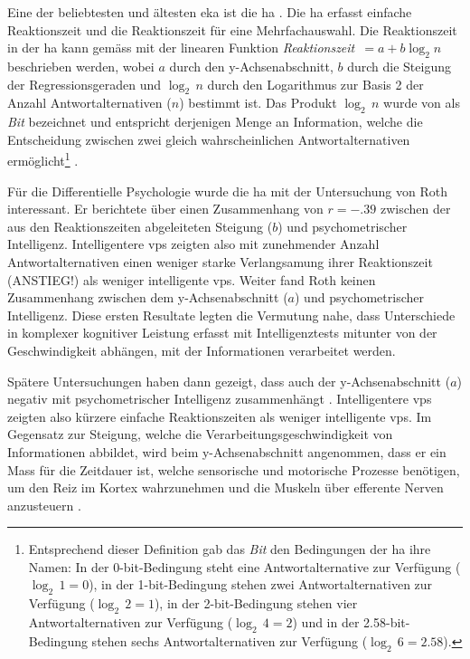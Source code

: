 \documentclass[11pt, twoside, a4paper]{book}		%
\begin{document}
Eine der beliebtesten und ältesten \gls{eka} ist die \gls{ha} \citep{Hick1952}. Die \gls{ha} erfasst einfache Reaktionszeit und die Reaktionszeit für eine Mehrfachauswahl. Die Reaktionszeit in der \gls{ha} kann gemäss \citet[S. 105]{Jensen1987a} mit der linearen Funktion \textit{Reaktionszeit}~$=a+b\log_{2}n$ beschrieben werden, wobei $a$ durch den y-Achsen\-ab\-schnitt, $b$ durch die Steigung der Regres\-sions\-geraden und $\log_{2}\,n$ durch den Logarithmus zur Basis 2 der Anzahl Antwortalternativen ($n$) bestimmt ist. Das Produkt $\log_{2}\,n$ wurde von \citet{Hick1952} als \textit{Bit} bezeichnet und entspricht derjenigen Menge an Information, welche die Entscheidung zwischen zwei gleich wahrscheinlichen Antwortalternativen ermöglicht\footnote{Entsprechend dieser Definition gab das \textit{Bit} den Bedingungen der \gls{ha} ihre Namen: In der 0-bit-Bedingung steht eine Antwortalternative zur Verfügung ($\log_{2}\,1=0$), in der 1-bit-Bedingung stehen zwei Antwortalternativen zur Verfügung ($\log_{2}\,2=1$), in der 2-bit-Bedingung stehen vier Antwortalternativen zur Verfügung ($\log_{2}\,4=2$) und in der 2.58-bit-Bedingung stehen sechs Antwortalternativen zur Verfügung ($\log_{2}\,6=2.58$).} \citep[siehe auch][S. 27]{Jensen2006}.

Für die Differentielle Psychologie wurde die \gls{ha} mit der Untersuchung von Roth \citep[1964; zitiert nach][S. 105]{Jensen1987a} interessant. Er berichtete über einen Zusammenhang von $r=-.39$ zwischen der aus den Reaktionszeiten abgeleiteten Steigung ($b$) und psychometrischer Intelligenz. Intelligentere \glspl{vp} zeigten also mit zunehmender Anzahl Antwortalternativen einen weniger starke Verlangsamung ihrer Reaktionszeit  (ANSTIEG!) als weniger intelligente \glspl{vp}. Weiter fand Roth keinen Zusammenhang zwischen dem y-Ach\-sen\-ab\-schnitt ($a$) und psychometrischer Intelligenz. Diese ersten Resultate legten die Vermutung nahe, dass Unterschiede in komplexer kognitiver Leistung erfasst mit Intelligenztests mitunter von der Geschwindigkeit abhängen, mit der Informationen verarbeitet werden.

Spätere Untersuchungen haben dann gezeigt, dass auch der y-Ach\-sen\-ab\-schnitt ($a$) negativ mit psychometrischer Intelligenz zusammenhängt \citep{Jensen1982b, Jensen1987a, Neubauer1997a, Neubauer1997b}. Intelligentere \glspl{vp} zeigten also kürzere einfache Reaktionszeiten als weniger intelligente \glspl{vp}. Im Gegensatz zur Steigung, welche die Verarbeitungsgeschwindigkeit von Informationen abbildet, wird beim y-Ach\-sen\-ab\-schnitt angenommen, dass er ein Mass für die Zeitdauer ist, welche sensorische und motorische Prozesse benötigen, um den Reiz im Kortex wahrzunehmen und die Muskeln über efferente Nerven anzusteuern \citep{Jensen1998b}.
\end{document}
